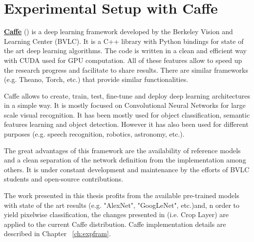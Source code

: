 
\section{Experimental Setup with Caffe}
\label{sec:expcaffe}
\href{http://caffe.berkeleyvision.org/}{\textbf{Caffe}} (\textcite{jia2014caffe}) is a deep learning framework developed by the Berkeley Vision and Learning Center (BVLC). It is a C++ library with Python bindings for state of the art deep learning algorithms. The code is written in a clean and efficient way with CUDA used for GPU computation. All of these features allow to speed up the research progress and  facilitate to share results. There are similar frameworks (e.g. Theano, Torch, etc.) that provide similar functionalities.

Caffe allows to create, train, test, fine-tune and deploy deep learning architectures in a simple way. It is mostly focused on Convolutional Neural Networks for large scale visual recognition. It has been mostly used for object classification, semantic features learning and object detection. However it has also been used for different purposes (e.g. speech recognition, robotics, astronomy, etc.).

The great advantages of this framework are the availability of reference models and a clean separation of the network definition from the implementation among others. It is under constant development and maintenance by the efforts of BVLC students and open-source contributions.

The work presented in this thesis profits from the available pre-trained models with state of the art results (e.g. "AlexNet", "GoogLeNet", etc.)and, n order to yield pixelwise classification, the changes presented in \textcite{long2014fully} (i.e. Crop Layer) are applied to the current Caffe distribution. Caffe implementation details are described in Chapter ~\ref{ch:expfram}.

